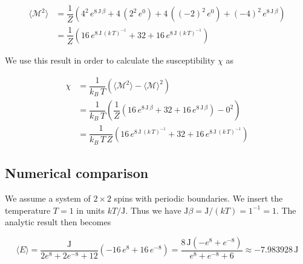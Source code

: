 \documentclass[a4paper, fontsize=11pt]{article}
\begin{document}
\begin{align}
\langle \mathcal{M}^2 \rangle &= \dfrac{1}{Z} \left( 4^2 \, e^{8 \, \text{J} \, \beta} + 4 \, (2^2 \, e^0 ) + 4 \, ((-2)^2 \, e^0) + (-4)^2 \, e^{8 \, \text{J} \, \beta} \right) 
\\
&=\dfrac{1}{Z} \left( 16 \, e^{8 \, \text{J} \, (k \, T)^{-1}} + 32 + 16 \, e^{8 \, \text{J} \, (k \, T)^{-1}} \right) 
\end{align}

We use this result in order to calculate the susceptibility $\chi$ as

\begin{align}
\chi &= \dfrac{1}{k_{B} \, T} \left( \langle \mathcal{M}^2 \rangle - \langle \mathcal{M} \rangle^2 \right)
\\
&=\dfrac{1}{k_{B} \, T} \left( \dfrac{1}{Z} \left( 16 \, e^{8 \, \text{J} \, \beta} + 32 + 16 \, e^{8 \, \text{J} \, \beta} \right)  - 0^2 \right)
\\
&= 
\dfrac{1}{k_{B} \, T \, Z} \left( 16 \, e^{8 \, \text{J} \, (k \, T)^{-1}} + 32 + 16 \, e^{8 \, \text{J} \, (k \, T)^{-1}} \right) 
\end{align}


\cite{H-Jensen}

\subsection{Numerical comparison}

We assume a system of $2 \times 2$ spins with periodic boundaries. We insert the temperature $T = 1$ in units $kT/\text{J}$. Thus we have $\text{J} \beta = \text{J}/(kT) = 1^{-1} = 1$. The analytic result then becomes 

\begin{equation}
\langle E \rangle = \dfrac{\text{J}}{2e^{8} + 2e^{-8} + 12} \left(-16\, e^{8} + 16 \, e^{-8} \right) = \dfrac{8\, \text{J}\left(- e^{8} + e^{-8} \right)}{e^{8} + e^{-8} + 6} \approx -7.983928 \, \text{J}
\end{equation}

\begin{table}[h!tb]
\centering
{}
\end{table}

\begin{table}[h!tb]
\centering
{}
\end{table}
\end{document}
